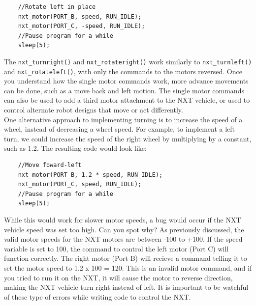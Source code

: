\documentclass[12pt]{article}
\begin{document}
\begin{verbatim}
    //Rotate left in place
    nxt_motor(PORT_B, speed, RUN_IDLE);
    nxt_motor(PORT_C, -speed, RUN_IDLE);
    //Pause program for a while
    sleep(5);
\end{verbatim}

The \verb+nxt_turnright()+ and \verb+nxt_rotateright()+ work similarly to \verb+nxt_turnleft()+ 
and \verb+nxt_rotateleft()+, with only the commands to the motors reversed. Once you understand 
how the single motor commands work, more advance movements can be done, such as a move back and left 
motion.  The single motor commands can also be used to add a third motor attachment to the NXT 
vehicle, or used to control alternate robot designs that move or act differently.
\newline
\\
One alternative approach to implementing turning is to increase the speed of a wheel, instead of 
decreasing a wheel speed. For example, to implement a left turn, we could increase the speed of 
the right wheel by multiplying by a constant, such as 1.2.  The resulting code would look like:

\begin{verbatim}
    //Move foward-left
    nxt_motor(PORT_B, 1.2 * speed, RUN_IDLE);
    nxt_motor(PORT_C, speed, RUN_IDLE);
    //Pause program for a while
    sleep(5);
\end{verbatim}

While this would work for slower motor speeds, a bug would occur if the NXT vehicle speed was 
set too high. Can you spot why? As previously discussed, the valid motor speeds for the NXT 
motors are between -100 to +100. If the speed variable is set to 100, the command to control 
the left motor (Port C) will function correctly.  The right motor (Port B) will recieve a 
command telling it to set the motor speed to 1.2 x 100 = 120. This is an invalid motor 
command, and if you tried to run it on the NXT, it will cause the motor to reverse direction, 
making the NXT vehicle turn right instead of left. It is important to be watchful of these 
type of errors while writing code to control the NXT.
\newline
\\


\end{document}
